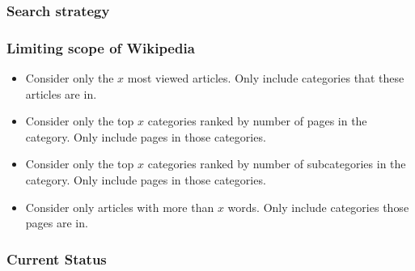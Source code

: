 \documentclass{beamer}
\begin{document}
\begin{frame}
\frametitle{Search strategy}

\end{frame}

\begin{frame}
\frametitle{Limiting scope of Wikipedia}

\begin{itemize}
\item Consider only the $x$ most viewed articles. Only include categories that
  these articles are in.

\item Consider only the top $x$ categories ranked by number of pages in the
  category. Only include pages in those categories.

\item Consider only the top $x$ categories ranked by number of subcategories in the
  category. Only include pages in those categories.

\item Consider only articles with more than $x$ words. Only include categories
  those pages are in.
\end{itemize}

\end{frame}

\begin{frame}
  \frametitle{Current Status}
\end{frame}
\end{document}
